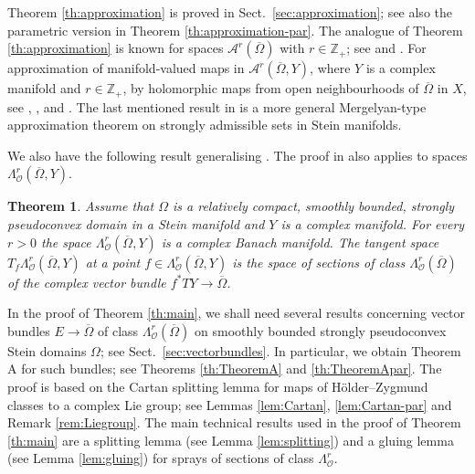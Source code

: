 \documentclass[11pt]{amsart}
\numberwithin{equation}{section}
\newtheorem{theorem}{Theorem}[section]
\theoremstyle{definition}
\newcommand\Ascr{\mathscr{A}}
\newcommand\Oscr{\mathscr{O}}
\newcommand\Z{\mathbb{Z}}
\begin{document}
Theorem \ref{th:approximation} is proved in Sect.\ \ref{sec:approximation};
see also the parametric version in Theorem \ref{th:approximation-par}. 
The analogue of Theorem \ref{th:approximation} is known for spaces 
$\Ascr^r(\overline\Omega)$ with $r\in\Z_+$; 
see \cite[Theorem 2.9.2,\ p.\ 87]{HenkinLeiterer1984} 
and \cite[Theorem 24, p.\ 165]{FornaessForstnericWold2020}.  
For approximation of manifold-valued maps in 
$\Ascr^r(\overline\Omega,Y)$, where $Y$ is a complex manifold
and $r\in\Z_+$,  
by holomorphic maps from open neighbourhoods of $\overline\Omega$
in $X$, see \cite[Theorem 1.2]{DrinovecForstneric2008FM},
\cite[Theorem 8.11.4]{Forstneric2017E}, and 
\cite[Corollary 9, p.\ 178]{FornaessForstnericWold2020}.
The last mentioned result in \cite{FornaessForstnericWold2020}
is a more general Mergelyan-type approximation theorem 
on strongly admissible sets in Stein manifolds.

We also have the following result generalising 
\cite[Theorem 1.1 (i)]{Forstneric2007AJM}.
The proof in \cite[Sect.\ 2]{Forstneric2007AJM} also applies to spaces
$\Lambda^r_\Oscr(\overline \Omega,Y)$.

\begin{theorem}\label{th:manifold}
Assume that $\Omega$ is 
a relatively compact, smoothly bounded, strongly 
pseudoconvex domain in a Stein manifold and 
$Y$ is a complex manifold. For every $r>0$ 
the space $\Lambda^r_\Oscr(\overline \Omega,Y)$ 
is a complex Banach manifold.
The tangent space $T_f \Lambda^r_\Oscr(\overline \Omega,Y)$ 
at a point $f\in \Lambda^r_\Oscr(\overline \Omega,Y)$
is the space of sections of class $\Lambda^r_\Oscr(\overline \Omega)$
of the complex vector bundle $f^*TY\to \overline \Omega$.
\end{theorem}

In the proof of Theorem \ref{th:main}, we shall need several
results concerning vector bundles $E\to\overline\Omega$ of
class $\Lambda^r_\Oscr(\overline\Omega)$ 
on smoothly bounded strongly pseudoconvex Stein domains
$\Omega$; see Sect.\ \ref{sec:vectorbundles}. 
In particular, we obtain Theorem A for such bundles; 
see Theorems \ref{th:TheoremA} and \ref{th:TheoremApar}. 
The proof is based on the Cartan splitting lemma 
for maps of H\"older--Zygmund classes to a complex Lie group;
see Lemmas \ref{lem:Cartan}, \ref{lem:Cartan-par}
and Remark \ref{rem:Liegroup}. 
The main technical results used in the proof of  Theorem \ref{th:main}
are a splitting lemma (see Lemma \ref{lem:splitting}) 
and a gluing lemma (see Lemma \ref{lem:gluing})
for sprays of sections of class $\Lambda^r_\Oscr$. 
\end{document}
